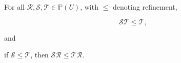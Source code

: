 For all $\mathcal{R}, \mathcal{S}, \mathcal{T} \in \mathbb{P}(U)$, with $\leq$ denoting refinement,

$$\mathcal{S}\mathcal{T} \leq \mathcal{T},$$

and

if $\mathcal{S} \leq \mathcal{T}$, then $\mathcal{S}\mathcal{R} \leq \mathcal{T}\mathcal{R}$.
